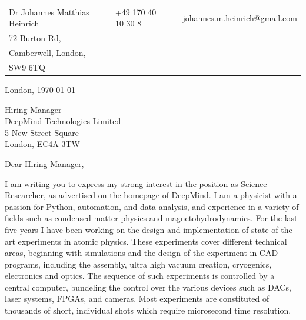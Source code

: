 \documentclass[10pt, a4paper]{class_cover_letter}
\begin{document}

\vspace{-0.8cm}


\begin{center}
\begin{table}[htpb]
\centering
\begin{tabular}{lllll}
 Dr Johannes Matthias Heinrich & \hspace{1.95cm} \textsc{\Large\icon{\Telefon}} & \hspace{0.01cm} +49 170 40 10 30 8 & \hspace{1.45cm} \textsc{\large\icon{@}} & \hspace{0.01cm} \href{mailto:johannes.m.heinrich@gmail.com}{johannes.m.heinrich@gmail.com}\\
72 Burton Rd, &  &  &  &  \\
Camberwell, London,  &  &  &  &  \\
SW9 6TQ &  &  &  & 
\end{tabular}
\end{table}
\end{center}


\hfill London, \today\\

\vspace{0.25cm}

Hiring Manager \\
DeepMind Technologies Limited\\
5 New Street Square\\
London, EC4A 3TW
	      
\vspace{1cm}

Dear Hiring Manager,

I am writing you to express my strong interest in the position as Science Researcher, as advertised on the homepage of DeepMind. I am a physicist with a passion for Python, automation, and data analysis, and experience in a variety of fields such as condensed matter physics and magnetohydrodynamics. For the last five years I have been working on the design and implementation of state-of-the-art experiments in atomic physics. These experiments cover different technical areas, beginning with simulations and the design of the experiment in CAD programs, including the assembly, ultra high vacuum creation, cryogenics, electronics and optics. The sequence of such experiments is controlled by a central computer, bundeling the control over the various devices such as DACs, laser systems, FPGAs, and cameras. Most experiments are constituted of thousands of short, individual shots which require microsecond time resolution.\\
\end{document}
